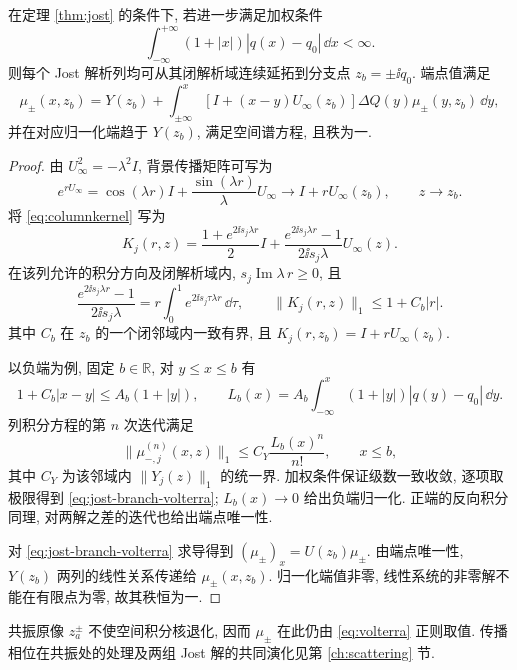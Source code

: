 \begin{proposition}[向分支点的连续延拓]\label{prop:jost-branch}
在定理 \ref{thm:jost} 的条件下, 若进一步满足加权条件
\begin{equation}\label{eq:jost-weighted}
\int_{-\infty}^{+\infty}(1+|x|)|q(x)-q_0|\,\dd x<\infty.
\end{equation}
则每个 Jost 解析列均可从其闭解析域连续延拓到分支点 $z_b=\pm\ii q_0$. 端点值满足
\begin{equation}\label{eq:jost-branch-volterra}
\mu_\pm(x,z_b)=Y(z_b)+\int_{\pm\infty}^{x}
[I+(x-y)U_\infty(z_b)]\Delta Q(y)\mu_\pm(y,z_b)\,\dd y,
\end{equation}
并在对应归一化端趋于 $Y(z_b)$, 满足空间谱方程, 且秩为一.
\end{proposition}
\begin{proof}
由 $U_\infty^2=-\lambda^2I$, 背景传播矩阵可写为
\begin{equation}\label{eq:background-propagator}
e^{rU_\infty}
=\cos(\lambda r)I+\dfrac{\sin(\lambda r)}{\lambda}U_\infty
\longrightarrow I+rU_\infty(z_b),\qquad z\to z_b.
\end{equation}
将 \eqref{eq:columnkernel} 写为
\begin{equation}\label{eq:branch-columnkernel}
K_j(r,z)=\dfrac{1+e^{2\ii s_j\lambda r}}{2}I
+\dfrac{e^{2\ii s_j\lambda r}-1}{2\ii s_j\lambda}U_\infty(z).
\end{equation}
在该列允许的积分方向及闭解析域内, $s_j\operatorname{Im}\lambda\,r\ge0$, 且
\[
\dfrac{e^{2\ii s_j\lambda r}-1}{2\ii s_j\lambda}
=r\int_0^1 e^{2\ii s_j\tau\lambda r}\,\dd\tau,\qquad
\|K_j(r,z)\|_1\le1+C_b|r|.
\]
其中 $C_b$ 在 $z_b$ 的一个闭邻域内一致有界, 且 $K_j(r,z_b)=I+rU_\infty(z_b)$.

以负端为例, 固定 $b\in\mathbb R$, 对 $y\le x\le b$ 有
\[
1+C_b|x-y|\le A_b(1+|y|),\qquad
L_b(x)=A_b\int_{-\infty}^{x}(1+|y|)|q(y)-q_0|\,\dd y.
\]
列积分方程的第 $n$ 次迭代满足
\[
\|\mu_{-,j}^{(n)}(x,z)\|_1
\le C_Y\dfrac{L_b(x)^n}{n!},\qquad x\le b,
\]
其中 $C_Y$ 为该邻域内 $\|Y_j(z)\|_1$ 的统一界. 加权条件保证级数一致收敛, 逐项取极限得到 \eqref{eq:jost-branch-volterra}; $L_b(x)\to0$ 给出负端归一化. 正端的反向积分同理, 对两解之差的迭代也给出端点唯一性.

对 \eqref{eq:jost-branch-volterra} 求导得到 $(\mu_\pm)_x=U(z_b)\mu_\pm$. 由端点唯一性, $Y(z_b)$ 两列的线性关系传递给 $\mu_\pm(x,z_b)$. 归一化端值非零, 线性系统的非零解不能在有限点为零, 故其秩恒为一.
\end{proof}

共振原像 $z_a^\pm$ 不使空间积分核退化, 因而 $\mu_\pm$ 在此仍由 \eqref{eq:volterra} 正则取值. 传播相位在共振处的处理及两组 Jost 解的共同演化见第 \ref{ch:scattering} 节.
